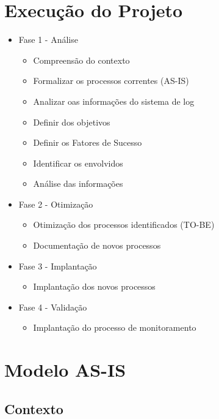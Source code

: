 \documentclass[11pt,a4paper]{article}
\begin{document}
\section{Execução do Projeto}
\begin{itemize}[noitemsep]
\item Fase 1 - Análise
	\begin{itemize}[noitemsep]
		\item Compreensão do contexto
		\item Formalizar os processos correntes (AS-IS)
		\item Analizar oas informações do sistema de log		
		\item Definir dos objetivos
		\item Definir os Fatores de Sucesso
		\item Identificar os envolvidos
		\item Análise das informações
	\end{itemize}		
\item Fase 2 - Otimização
	\begin{itemize}[noitemsep]
		\item Otimização dos processos identificados (TO-BE)	
		\item Documentação de novos processos	
	\end{itemize}
\item Fase 3 - Implantação
	\begin{itemize}[noitemsep]
		\item  Implantação dos novos processos
	\end{itemize}
\item Fase 4 - Validação
	\begin{itemize}[noitemsep]
		\item Implantação do processo de monitoramento	
	\end{itemize}

\end{itemize}

\section{Modelo AS-IS}
\subsection{Contexto}
\end{document}

